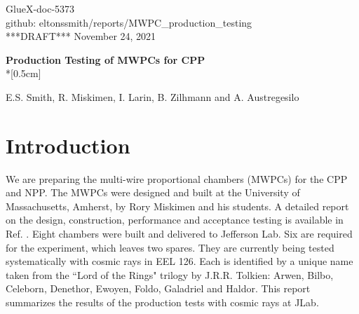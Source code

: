 \documentclass[12pt]{article}
\begin{document}
\begin{flushright}
GlueX-doc-5373\\
github: eltonssmith/reports/MWPC\_production\_testing\\
***DRAFT*** November 24, 2021
\end{flushright}




\begin{center}
{\Large \bf Production Testing of MWPCs for CPP}\\*[0.5cm]
\end{center}

\begin{center}   
{\sc  E.S. Smith, R. Miskimen, I. Larin, B. Zilhmann and A. Austregesilo}\\  
\end{center}


\section{Introduction}
We are preparing the multi-wire proportional chambers (MWPCs) for the CPP\cite{CPPexp} and NPP\cite{NPPexp}. The MWPCs were designed and built at the University of Massachusetts, Amherst, by Rory Miskimen and his students. A detailed report on the design, construction, performance and acceptance testing is available in Ref. \cite{hdnote5080}. Eight chambers were built and delivered to Jefferson Lab. Six are required for the experiment, which leaves two spares. They are currently being tested systematically with cosmic rays in EEL 126. Each is identified by a unique name taken from the ``Lord of the Rings" trilogy by J.R.R. Tolkien: Arwen, Bilbo, Celeborn, Denethor, Ewoyen, Foldo, Galadriel and Haldor. This report summarizes the results of the production tests with cosmic rays at JLab.
\end{document}
